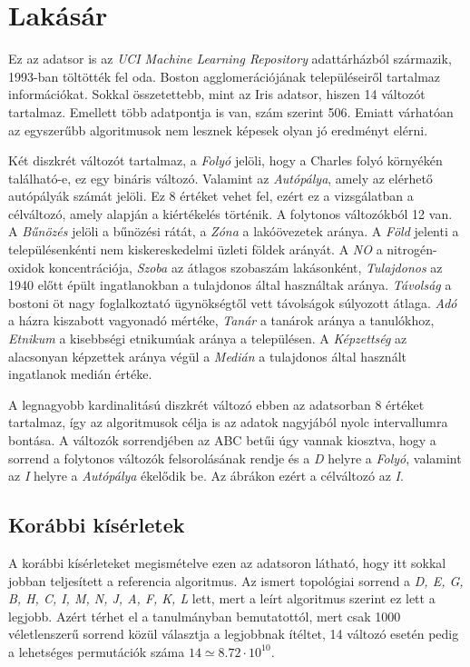 \section{Lakásár}
Ez az adatsor is az \emph{UCI Machine Learning Repository} adattárházból származik, 1993-ban töltötték fel oda. Boston agglomerációjának településeiről tartalmaz információkat. Sokkal összetettebb, mint az Iris adatsor, hiszen 14 változót tartalmaz. Emellett több adatpontja is van, szám szerint 506. Emiatt várhatóan az egyszerűbb algoritmusok nem lesznek képesek olyan jó eredményt elérni.

Két diszkrét változót tartalmaz, a \emph{Folyó} jelöli, hogy a Charles folyó környékén található-e, ez egy bináris változó. Valamint az \emph{Autópálya}, amely az elérhető autópályák számát jelöli. Ez 8 értéket vehet fel, ezért ez a vizsgálatban a célváltozó, amely alapján a kiértékelés történik. A folytonos változókból 12 van. A \emph{Bűnözés} jelöli a bűnözési rátát, a \emph{Zóna} a lakóövezetek aránya. A \emph{Föld} jelenti a településenkénti nem kiskereskedelmi üzleti földek arányát. A \emph{NO} a nitrogén-oxidok koncentrációja, \emph{Szoba} az átlagos szobaszám lakásonként, \emph{Tulajdonos} az 1940 előtt épült ingatlanokban a tulajdonos által használtak aránya. \emph{Távolság} a bostoni öt nagy foglalkoztató ügynökségtől vett távolságok súlyozott átlaga. \emph{Adó} a házra kiszabott vagyonadó mértéke, \emph{Tanár} a tanárok aránya a tanulókhoz, \emph{Etnikum} a kisebbségi etnikumúak aránya a településen. A \emph{Képzettség} az alacsonyan képzettek aránya végül a \emph{Medián} a tulajdonos által használt ingatlanok medián értéke.

A legnagyobb kardinalitású diszkrét változó ebben az adatsorban 8 értéket tartalmaz, így az algoritmusok célja is az adatok nagyjából nyolc intervallumra bontása. A változók sorrendjében az ABC betűi úgy vannak kiosztva, hogy a sorrend a folytonos változók felsorolásának rendje és a \emph{D} helyre a \emph{Folyó}, valamint az \emph{I} helyre a \emph{Autópálya} ékelődik be. Az ábrákon ezért a célváltozó az \emph{I}.

\subsection{Korábbi kísérletek}
A korábbi kísérleteket megismételve ezen az adatsoron látható, hogy itt sokkal jobban teljesített a referencia algoritmus. Az ismert topológiai sorrend a \emph{D, E, G, B, H, C, I, M, N, J, A, F, K, L} lett, mert a leírt algoritmus szerint ez lett a legjobb. Azért térhet el a tanulmányban bemutatottól, mert csak 1000 véletlenszerű sorrend közül választja a legjobbnak ítéltet, 14 változó esetén pedig a lehetséges permutációk száma $14\! \simeq 8.72 \cdot 10^{10}$.


